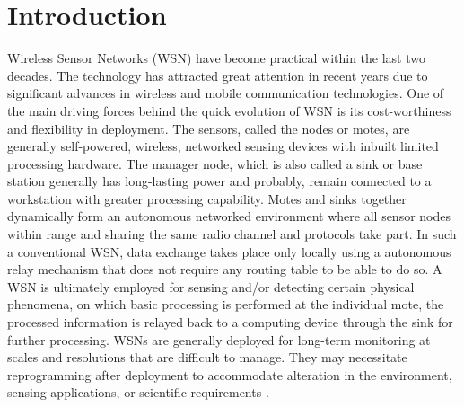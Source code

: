 \documentclass[conference,final]{IEEEtran}
\newcommand{\dme}[2]{\pdfmarkupcomment[markup=Highlight,color=yellow]{#1}{#2}}
\begin{document}



\section{Introduction}
\label{sec:intro}


Wireless Sensor Networks (WSN) have become practical within the last two decades. %
The technology has attracted great attention in recent years due to significant advances in wireless and mobile communication technologies. 
One of the main driving forces behind the quick evolution of WSN is its cost-worthiness and flexibility in deployment.
The sensors, called the nodes or motes, are generally self-powered, wireless, networked sensing devices with inbuilt limited processing hardware.    
The manager node, which is also called a sink or base station generally has long-lasting power and probably, remain connected to a workstation with greater processing capability. 
Motes and sinks together dynamically form an autonomous networked environment where all sensor nodes within range and sharing the same radio channel and protocols take part.
In such a conventional WSN, data exchange takes place only locally using a autonomous relay mechanism that does not require any routing table to be able to do so. 
A WSN is ultimately employed for sensing and/or detecting certain physical phenomena, on which basic processing is performed at the individual mote, the processed information is relayed back to a computing device  through the sink for further processing.
WSNs are generally deployed for long-term monitoring at scales and resolutions that are difficult to manage. 
They may necessitate reprogramming after deployment to accommodate alteration in the environment, sensing applications, or scientific requirements \cite{ISI:000253439700120}.
\end{document}
